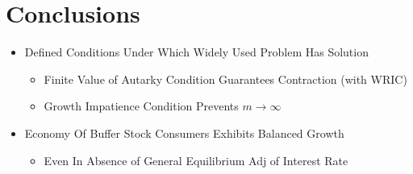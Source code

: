 \documentclass[pdflatex]{beamer}\providecommand{\texname}{BufferStockTheorySlides}%
\begin{document}
\section{Conclusions}
\begin{frame}

\begin{itemize}
\item Defined Conditions Under Which Widely Used Problem Has Solution
\begin{itemize}
\item Finite Value of Autarky Condition Guarantees Contraction (with WRIC)
\item Growth Impatience Condition Prevents $m \rightarrow \infty$
\end{itemize}
\item Economy Of Buffer Stock Consumers Exhibits Balanced Growth
\begin{itemize}
\item Even In Absence of General Equilibrium Adj of Interest Rate
\end{itemize}
\end{itemize}

\end{frame}

\def\newblock{\hskip .11em plus .33em minus .07em}

\begin{frame}

\renewcommand{\bibsection}{\subsubsection*{\bibname }}

\tiny 



\end{frame}
\end{document}
